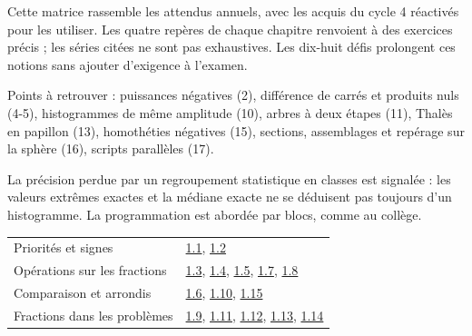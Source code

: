 \clearpage{}\label{couverture-programme}
\gdef\otChapNum{0}\pagestyle{otFront}
Cette matrice rassemble les attendus annuels, avec les acquis du cycle 4
réactivés pour les utiliser. Les quatre repères de chaque chapitre renvoient
à des exercices précis ; les séries citées ne sont pas exhaustives.
Les dix-huit défis prolongent ces notions sans ajouter d’exigence à l’examen.\par\bigskip
Points à retrouver : puissances négatives (2), différence de carrés et
produits nuls (4-5), histogrammes de même amplitude (10), arbres à deux
étapes (11), Thalès en papillon (13), homothéties négatives (15), sections,
assemblages et repérage sur la sphère (16), scripts parallèles (17).\par\bigskip
\begin{attention}La précision perdue par un regroupement statistique en classes est signalée :
les valeurs extrêmes exactes et la médiane exacte ne se déduisent pas toujours
d’un histogramme. La programmation est abordée par blocs, comme au collège.\end{attention}
\clearpage
{}\fontsize{10}{13}\selectfont
{}\begin{tabularx}{\linewidth}{@{}Yl@{}}\toprule
Priorités et signes & \hyperref[exo-1-1]{1.1}, \hyperref[exo-1-2]{1.2}\\[2mm]
Opérations sur les fractions & \hyperref[exo-1-3]{1.3}, \hyperref[exo-1-4]{1.4}, \hyperref[exo-1-5]{1.5}, \hyperref[exo-1-7]{1.7}, \hyperref[exo-1-8]{1.8}\\[2mm]
Comparaison et arrondis & \hyperref[exo-1-6]{1.6}, \hyperref[exo-1-10]{1.10}, \hyperref[exo-1-15]{1.15}\\[2mm]
Fractions dans les problèmes & \hyperref[exo-1-9]{1.9}, \hyperref[exo-1-11]{1.11}, \hyperref[exo-1-12]{1.12}, \hyperref[exo-1-13]{1.13}, \hyperref[exo-1-14]{1.14}\\[2mm]
\bottomrule\end{tabularx}\par\vspace{4mm}
